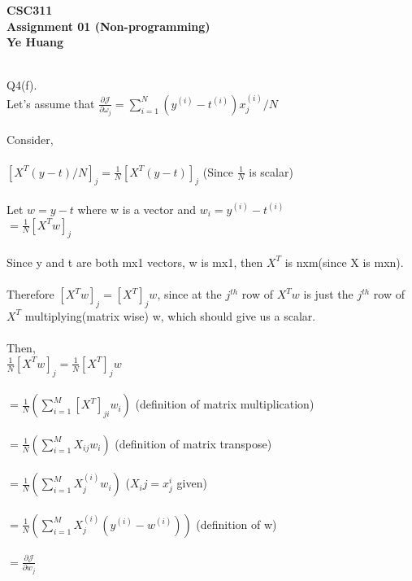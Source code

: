 \documentclass{article}
\begin{document}
\begin{center}
\textbf{
    CSC311\\
    Assignment 01 (Non-programming)\\
    Ye Huang\\
}
\end{center}

\textrm{\\
Q4(f).\\
\indent \indent Let's assume that $\frac{\partial \mathcal{J}}{\partial \omega_j} = \sum_{i=1}^{N} (y^{(i)} - t^{(i)})x^{(i)}_j / N$\\
\\
\indent \indent Consider, \\
\\
\indent \indent $[X^T(y-t)/N]_j = \frac{1}{N}[X^T(y-t)]_j$ (Since $\frac{1}{N}$ is scalar)\\
\\
\indent \indent Let $w = y-t$ where w is a vector and $w_i = y^{(i)} - t^{(i)}$\\
\indent \indent $=\frac{1}{N}[X^Tw]_j$\\
\\
\indent \indent Since y and t are both mx1 vectors, w is mx1, then $X^T$ is nxm(since X is mxn).\\
\\
\indent \indent Therefore $[X^Tw]_j = [X^T]_jw$, since at the $j^{th}$ row of $X^Tw$ is just the $j^{th}$ row of $X^T$ multiplying(matrix wise) w, which should give us a scalar.\\
\\
\indent \indent Then,\\
\indent \indent $\frac{1}{N}[X^Tw]_j = \frac{1}{N}[X^T]_jw$\\
\\
\indent \indent $=\frac{1}{N}(\sum_{i=1}^{M}[X^T]_{ji}w_i)$ (definition of matrix multiplication)\\
\\
\indent \indent $=\frac{1}{N}(\sum_{i=1}^{M}X_{ij}w_i)$ (definition of matrix transpose)\\
\\
\indent \indent $=\frac{1}{N}(\sum_{i=1}^{M}X_j^{(i)}w_i)$ ($X_ij = x_j^{i}$ given)\\
\\
\indent \indent $=\frac{1}{N}(\sum_{i=1}^{M}X_j^{(i)}(y^{(i)}-w^{(i)}))$ (definition of w)\\
\\
\indent \indent $=\frac{\partial \mathcal{J}}{\partial w_j}$\\
}
\end{document}
